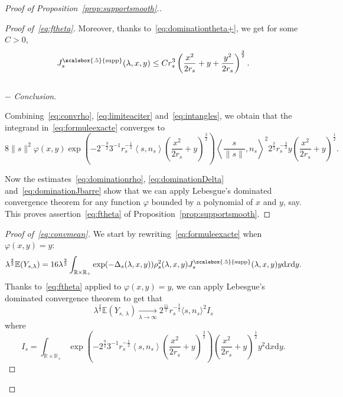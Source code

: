 \documentclass[AHL,Unicode,longabstracts,published]{cedram}
\newcommand{\dd}{\mathrm{d}}
\newcommand{\E}{\mathbb{E}}
\newcommand{\R}{\mathbb{R}}
\DeclareMathOperator{\supp}{\scalebox{.5}{supp}}
\newcommand{\pass}{\vspace{0.3cm}\noindent}
\newcommand{\noi}{\noindent}
\newenvironment*{prooff}{\begin{proof}}{\let\qed\relax\end{proof}}
\newenvironment*{lastprooff}{\begin{proof}}{\end{proof}}
\newcommand{\R}{\mathbb{R}}
\begin{document}
\begin{proof}[{Proof of Proposition~\ref{prop:supportsmooth}.}]
\begin{prooff}[{Proof of~\eqref{eq:ftheta}}]
Moreover, thanks to~\eqref{eq:dominationtheta+}, we get for some $C>0$,
\begin{equation}\label{eq:dominationJbarre}
J^{\supp}_{s}(\lambda,x,y)\le C r_s^3\left(\frac{x^2}{2r_s}+y+\frac{y^2}{2r_s}\right)^{\frac{3}{2}}.
\end{equation}\\
$-$ \emph{Conclusion}.

Combining~\eqref{eq:convrho}, \eqref{eq:limiteaciter} and~\eqref{eq:intangles}, we obtain that the integrand in~\eqref{eq:formuleexacte} converges to
\begin{equation*}
8\|s\|^2\varphi(x,y)\exp\!\left(-2^{-\frac{9}{2}}3^{-1}r_{s}^{-\frac1{2}}\left\langle s,n_s\right\rangle\left(\frac{x^2}{2r_{s}}+y\right)^{\frac{3}{2}} \right)\left\langle\frac{s}{\|s\|},n_s\!\right\rangle^2 2^{\frac{3}{2}}r_s^{-\frac{3}{2}}y\left(\frac{x^2}{2r_s}+y\!\right)^{\frac1{2}}.
\end{equation*}

Now the estimates~\eqref{eq:dominationrho}, \eqref{eq:dominationDelta} and~\eqref{eq:dominationJbarre} show that we can apply Lebesgue's dominated convergence theorem for any function $\varphi$ bounded by a polynomial of $x$ and $y$, say. This proves assertion~\eqref{eq:ftheta} of Proposition~\ref{prop:supportsmooth}.
\end{prooff}

\begin{lastprooff}[{Proof of~\eqref{eq:convmean}}]
We start by rewriting~\eqref{eq:formuleexacte} when $\varphi(x,y)=y$:
\begin{equation}\label{eq:formuleYexacte}
\lambda^{\frac{2}{3}}\E(Y_{s,\lambda}) = 16\lambda^{\frac23}\int_{\R\times \R_+}\exp(-\Delta_s(\lambda,x,y))\rho_s^2(\lambda,x,y)J^{\supp}_s(\lambda,x,y)y\dd x \dd y.
\end{equation}
Thanks to~\eqref{eq:ftheta} applied to $\varphi(x,y)=y$, we can apply Lebesgue's dominated convergence theorem to get that
\begin{equation*}\label{eq:premiereformule}
\lambda^{\frac{2}{3}}\E(Y_{s,\,\lambda}) \underset{\lambda\to\infty}{\longrightarrow} 2^{\frac{11}{2}} r_s^{-\frac{3}{2}}\langle s,n_s\rangle^2I_s
\end{equation*}
where
\begin{equation*}\label{eq:defIs}
I_s =\int_{\R\times\R_+}\exp\left(-2^{\frac{9}{2}} 3^{-1}r_s^{-\frac1{2}}\left\langle s,n_s\right\rangle \left(\frac{x^2}{2r_s}+y\right)^{\frac{3}{2}}\right)\left(\frac{x^2}{2r_s}+y\right)^{\frac1{2}}y^2 \dd x \dd y.
\end{equation*}


\end{lastprooff}
\end{proof}
\end{document}
